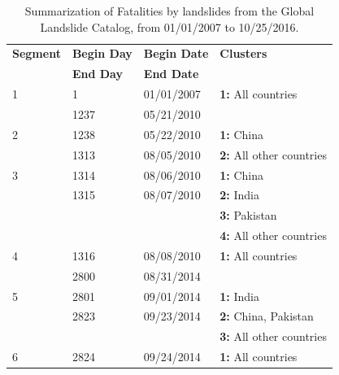 

\begin{table}[!h]
\centering
    \caption{Summarization of Fatalities by landslides from the Global Landslide Catalog, from 01/01/2007 to 10/25/2016.}     
    \label{tab:landslide}
    \begin{small}
\begin{tabular}{p{0.35in}p{0.55in}p{0.6in}p{1.2in}}
    \hline
    {\bfseries Segment} &{\bfseries Begin Day} &{\bfseries Begin Date} & {\bfseries  Clusters}   \\
   &{\bfseries End Day} &{\bfseries End Date} &  \\
    \hline
    1&1 & 01/01/2007&{\bfseries 1:} All countries    \\
      &1237& 05/21/2010&   \\
    \hline
        2&1238 & 05/22/2010&{\bfseries 1:} China   \\
      &1313& 08/05/2010&  {\bfseries 2:} All other countries    \\
    \hline
        3&1314 & 08/06/2010&{\bfseries 1:} China   \\
      &1315& 08/07/2010&  {\bfseries 2:} India    \\
       && &  {\bfseries 3:} Pakistan    \\
       && &  {\bfseries 4:} All other countries     \\
    \hline
            4& 1316 & 08/08/2010&{\bfseries 1:} All countries   \\
      & 2800 & 08/31/2014&     \\
     \hline
      5& 2801 & 09/01/2014&{\bfseries 1:} India   \\
      & 2823 & 09/23/2014&  {\bfseries 2:} China, Pakistan  \\
      &  & &  {\bfseries 3:} All other countries  \\
     \hline
       6& 2824 & 09/24/2014&{\bfseries 1:} All countries   \\

\end{tabular}
\end{small}
\end{table}
